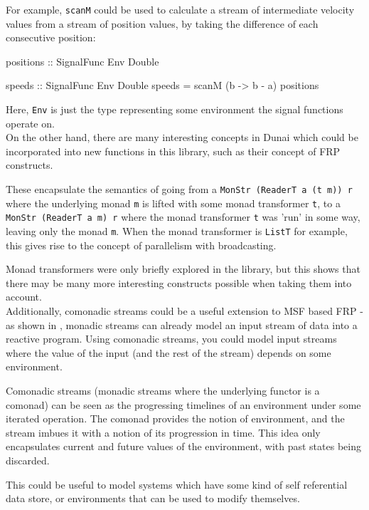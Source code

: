 \documentclass{article}
\begin{document}
For example, \verb+scanM+ could be used to calculate a stream of intermediate velocity values from a stream of position values, by taking the difference of each consecutive position:
\begin{haskell}
positions :: SignalFunc Env Double 

speeds :: SignalFunc Env Double 
speeds = scanM (\a b -> b - a) positions
\end{haskell}

Here, \verb+Env+ is just the type representing some environment the signal functions operate on. \\

On the other hand, there are many interesting concepts in Dunai which could be incorporated into new functions in this library, such as their concept of FRP constructs. 

These encapsulate the semantics of going from a \verb+MonStr (ReaderT a (t m)) r+ where the underlying monad \verb+m+ is lifted with some monad transformer \verb+t+, to a \verb+MonStr (ReaderT a m) r+ where the monad transformer \verb+t+ was 'run' in some way, leaving only the monad \verb+m+. When the monad transformer is \verb+ListT+ for example, this gives rise to the concept of parallelism with broadcasting. 

Monad transformers were only briefly explored in the library, but this shows that there may be many more interesting constructs possible when taking them into account. \\

Additionally, comonadic streams could be a useful extension to MSF based FRP - as shown in \cite{frp_refactored}, monadic streams can already model an input stream of data into a reactive program. Using comonadic streams, you could model input streams where the value of the input (and the rest of the stream) depends on some environment. 

Comonadic streams (monadic streams where the underlying functor is a comonad) can be seen as the progressing timelines of an environment under some iterated operation. The comonad provides the notion of environment, and the stream imbues it with a notion of its progression in time. This idea only encapsulates current and future values of the environment, with past states being discarded.

This could be useful to model systems which have some kind of self referential data store, or environments that can be used to modify themselves. \\
\end{document}
